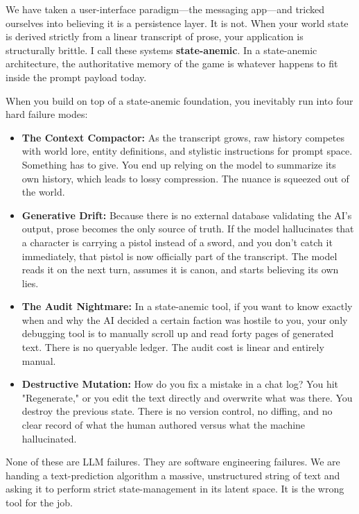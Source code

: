 \documentclass[12pt, a4paper]{article}
\begin{document}
We have taken a user-interface paradigm---the messaging app---and tricked ourselves into believing it is a persistence layer. It is not. When your world state is derived strictly from a linear transcript of prose, your application is structurally brittle. I call these systems \textbf{state-anemic}. In a state-anemic architecture, the authoritative memory of the game is whatever happens to fit inside the prompt payload today.




When you build on top of a state-anemic foundation, you inevitably run into four hard failure modes:

\begin{itemize}
    \item \textbf{The Context Compactor:} As the transcript grows, raw history competes with world lore, entity definitions, and stylistic instructions for prompt space. Something has to give. You end up relying on the model to summarize its own history, which leads to lossy compression. The nuance is squeezed out of the world.
    \item \textbf{Generative Drift:} Because there is no external database validating the AI's output, prose becomes the only source of truth. If the model hallucinates that a character is carrying a pistol instead of a sword, and you don't catch it immediately, that pistol is now officially part of the transcript. The model reads it on the next turn, assumes it is canon, and starts believing its own lies.
    \item \textbf{The Audit Nightmare:} In a state-anemic tool, if you want to know exactly when and why the AI decided a certain faction was hostile to you, your only debugging tool is to manually scroll up and read forty pages of generated text. There is no queryable ledger. The audit cost is linear and entirely manual.
    \item \textbf{Destructive Mutation:} How do you fix a mistake in a chat log? You hit "Regenerate," or you edit the text directly and overwrite what was there. You destroy the previous state. There is no version control, no diffing, and no clear record of what the human authored versus what the machine hallucinated.
\end{itemize}


None of these are LLM failures. They are software engineering failures. We are handing a text-prediction algorithm a massive, unstructured string of text and asking it to perform strict state-management in its latent space. It is the wrong tool for the job.
\end{document}
